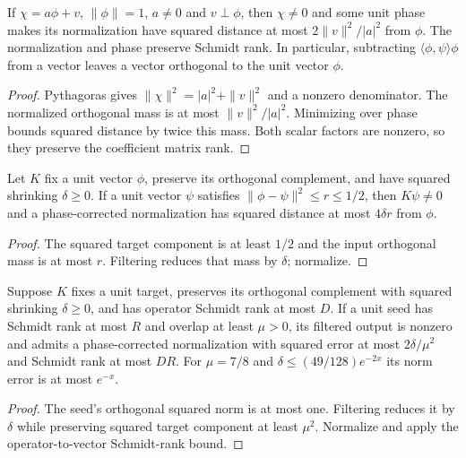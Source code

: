 \begin{lemma}
    \label{lem:aklv_phase_normalization}
    \leanok
    If $\chi=a\phi+v$, $\|\phi\|=1$, $a\ne0$ and $v\perp\phi$, then $\chi\ne0$
    and some unit phase makes its normalization have squared distance at most
    $2\|v\|^2/|a|^2$ from $\phi$. The normalization and phase preserve Schmidt rank.
    In particular, subtracting $\langle\phi,\psi\rangle\phi$ from a vector
    leaves a vector orthogonal to the unit vector $\phi$.
\end{lemma}
\begin{proof}\leanok
    Pythagoras gives $\|\chi\|^2=|a|^2+\|v\|^2$ and a nonzero denominator.
    The normalized orthogonal mass is at most $\|v\|^2/|a|^2$. Minimizing
    over phase bounds squared distance by twice this mass. Both scalar factors
    are nonzero, so they preserve the coefficient matrix rank.
\end{proof}

\begin{lemma}
    \label{lem:aklv_nearby_filtered_vector}
    \leanok
    Let $K$ fix a unit vector $\phi$, preserve its orthogonal complement, and
    have squared shrinking $\delta\ge0$. If a unit vector $\psi$ satisfies
    $\|\phi-\psi\|^2\le r\le1/2$, then $K\psi\ne0$ and a phase-corrected
    normalization has squared distance at most $4\delta r$ from $\phi$.
\end{lemma}
\begin{proof}\leanok
    The squared target component is at least $1/2$ and the input orthogonal
    mass is at most $r$. Filtering reduces that mass by $\delta$; normalize.
\end{proof}

\begin{lemma}
    \label{lem:aklv_filtered_seed}
    \leanok
    Suppose $K$ fixes a unit target, preserves its orthogonal complement with
    squared shrinking $\delta\ge0$, and has operator Schmidt rank at most $D$.
    If a unit seed has Schmidt rank at most $R$ and overlap at least $\mu>0$,
    its filtered output is nonzero and admits a phase-corrected normalization
    with squared error at most $2\delta/\mu^2$ and Schmidt rank at most $DR$.
    For $\mu=7/8$ and $\delta\le(49/128)e^{-2x}$ its norm error is at most $e^{-x}$.
\end{lemma}
\begin{proof}\leanok
    The seed's orthogonal squared norm is at most one. Filtering reduces it by
    $\delta$ while preserving squared target component at least $\mu^2$.
    Normalize and apply the operator-to-vector Schmidt-rank bound.
\end{proof}
